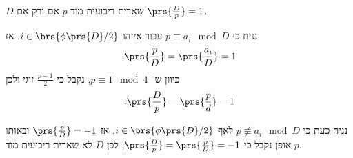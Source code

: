 \documentclass[a4paper,10pt,twoside,openany]{book}
\begin{document}
\begin{solution}
$D$
שארית ריבועית מוד
$p$
אם ורק אם
$\prs{\frac{D}{p}} = 1$.

נניח כי
$p \equiv a_i \mod{D}$
עבור איזהו
$i \in \brs{\phi\prs{D} / 2}$.
אז
\begin{align*}
\text{.} \prs{\frac{p}{D}} = \prs{\frac{a_i}{D}} = 1
\end{align*}
כיוון ש־%
$p \equiv 1 \mod{4}$,
נקבל כי
$\frac{p-1}{2}$
זוגי ולכן
\begin{align*}
\text{.} \prs{\frac{D}{p}} = \prs{\frac{p}{d}} = 1
\end{align*}

נניח כעת כי
$p \not\equiv a_i \mod{D}$
לאף
$i \in \brs{\phi\prs{D}/2}$.
אז
$\prs{\frac{p}{D}} = -1$
ובאותו אופן נקבל כי
$\prs{\frac{D}{p}} = \prs{\frac{p}{D}} = -1$,
לכן
$D$
לא שארית ריבועית מוד
$p$.
\end{solution}
\end{document}
